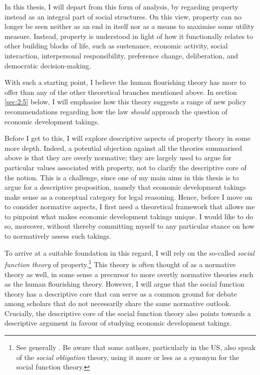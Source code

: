 In this thesis, I will depart from this form of analysis, by regarding property instead as an integral part of social structures. On this view, property can no longer be seen neither as an end in itself nor as a means to maximise some utility measure. Instead, property is understood in light of how it functionally relates to other building blocks of life, such as sustenance, economic activity, social interaction, interpersonal responsibility, preference change, deliberation, and democratic decision-making.

With such a starting point, I believe the human flourishing theory has more to offer than any of the other theoretical branches mentioned above. In section \ref{sec:2:5} below, I will emphasise how this theory suggests a range of new policy recommendations regarding how the law {\it should} approach the question of economic development takings.

Before I get to this, I will explore descriptive aspects of property theory in some more depth. Indeed, a potential objection against all the theories summarised above is that they are overly normative; they are largely used to argue for particular values associated with property, not to clarify the descriptive core of the notion. This is a challenge, since one of my main aims in this thesis is to argue for a descriptive proposition, namely that economic development takings make sense as a conceptual category for legal reasoning. Hence, before I move on to consider normative aspects, I first need a theoretical framework that allows me to pinpoint what makes economic development takings unique. I would like to do so, moreover, without thereby committing myself to any particular stance on how to normatively assess such takings.

To arrive at a suitable foundation in this regard, I will rely on the so-called {\it social function theory} of property.\footnote{See generally \cite{foster11,mirow10,alexander09a}. Be aware that some authors, particularly in the US, also speak of the {\it social obligation} theory, using it more or less as a synonym for the social function theory.} This theory is often thought of as a normative theory as well, in some sense a precursor to more overtly normative theories such as the human flourishing theory. However, I will argue that the social function theory has a descriptive core that can serve as a common ground for debate among scholars that do not necessarily share the same normative outlook. Crucially, the descriptive core of the social function theory also points towards a descriptive argument in favour of studying economic development takings.

